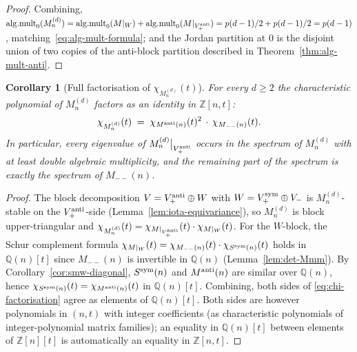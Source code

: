 \documentclass{amsart}
\newtheorem{corollary}[theorem]{Corollary}
\theoremstyle{definition}
\theoremstyle{remark}
\begin{document}
\begin{proof}
Combining,
$\mathrm{alg.mult}_0(M_n^{(d)})
= \mathrm{alg.mult}_0(M|_W) + \mathrm{alg.mult}_0(M|_{V_+^{\rm anti}})
= p(d-1)/2 + p(d-1)/2 = p(d-1)$,
matching~\eqref{eq:alg-mult-formula}; and the Jordan partition
at $0$ is the disjoint union of two copies of the anti-block
partition described in Theorem~\ref{thm:alg-mult-anti}.
\end{proof}

\begin{corollary}[Full factorisation of
$\chi_{M_n^{(d)}}(t)$]
\label{cor:chi-factorisation}
For every $d \ge 2$ the characteristic polynomial of
$M_n^{(d)}$ factors as an identity in $\mathbb Z[n,t]$:
\begin{equation}\label{eq:chi-factorisation}
  \chi_{M_n^{(d)}}(t)
  \;=\; \chi_{M^{\rm anti}(n)}(t)^{2} \,\cdot\,
        \chi_{M_{--}(n)}(t).
\end{equation}
In particular, every eigenvalue of
$M_n^{(d)}\big|_{V_+^{\rm anti}}$ occurs in the spectrum of
$M_n^{(d)}$ with at least double algebraic multiplicity, and
the remaining part of the spectrum is exactly the spectrum of
$M_{--}(n)$.
\end{corollary}

\begin{proof}
The block decomposition $V = V_+^{\rm anti} \oplus W$ with
$W = V_+^{\rm sym} \oplus V_-$ is $M_n^{(d)}$-stable on the
$V_+^{\rm anti}$-side (Lemma~\ref{lem:iota-equivariance}),
so $M_n^{(d)}$ is block upper-triangular and
$\chi_{M_n^{(d)}}(t) = \chi_{M|_{V_+^{\rm anti}}}(t) \cdot
 \chi_{M|_W}(t)$.
For the $W$-block, the Schur complement formula
$\chi_{M|_W}(t) = \chi_{M_{--}(n)}(t) \cdot
 \chi_{S^{\rm sym}(n)}(t)$ holds in $\mathbb Q(n)[t]$ since
$M_{--}(n)$ is invertible in $\mathbb Q(n)$
\textup{(}Lemma~\ref{lem:det-Mmm}\textup{)}.  By
Corollary~\ref{cor:smw-diagonal}, $S^{\rm sym}(n)$ and
$M^{\rm anti}(n)$ are similar over $\mathbb Q(n)$, hence
$\chi_{S^{\rm sym}(n)}(t) = \chi_{M^{\rm anti}(n)}(t)$ in
$\mathbb Q(n)[t]$.  Combining, both sides of
\eqref{eq:chi-factorisation} agree as elements of
$\mathbb Q(n)[t]$.  Both sides are however polynomials in $(n, t)$
with integer coefficients \textup{(}as characteristic
polynomials of integer-polynomial matrix families\textup{)};
an equality in $\mathbb Q(n)[t]$ between elements of
$\mathbb Z[n][t]$ is automatically an equality in
$\mathbb Z[n,t]$.
\end{proof}
\end{document}
